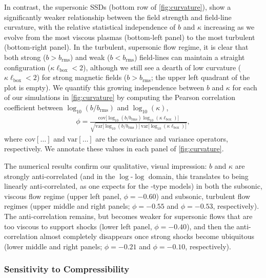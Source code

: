 In contrast, the supersonic SSDs (bottom row of \autoref{fig:curvature}), show a significantly weaker relationship between the field strength and field-line curvature, with the relative statistical independence of $b$ and $\kappa$ increasing as we evolve from the most viscous plasmas (bottom-left panel) to the most turbulent (bottom-right panel). In the turbulent, supersonic flow regime, it is clear that both strong ($b > b_\mathrm{rms}$) and weak ($b < b_\mathrm{rms}$) field-lines can maintain a straight configuration ($\kappa \ell_\mathrm{box} < 2$), although we still see a dearth of low curvature ($\kappa \ell_\mathrm{box} < 2$) for strong magnetic fields ($b > b_\mathrm{rms}$; \ie the upper left quadrant of the plot is empty). We quantify this growing independence between $b$ and $\kappa$ for each of our simulations in \autoref{fig:curvature} by computing the Pearson correlation coefficient between $\log_{10}(b/b_{\mathrm{rms}})$ and $\log_{10}(\kappa)$,
\begin{align}\label{eq:pearson_correlation}
    \phi = \frac{
            \mathrm{cov}\big[ \log_{10}(b/b_{\mathrm{rms}}) \log_{10}(\kappa\ell_{\mathrm{box}}) \big]
        }{
            \sqrt{
                \mathrm{var}\big[ \log_{10}(b/b_{\mathrm{rms}}) \big]
                \, \mathrm{var}\big[ \log_{10}(\kappa\ell_{\mathrm{box}}) \big]
            }
        }
        ,
\end{align}
where $\mathrm{cov}[\hdots]$ and $\mathrm{var}[\hdots]$ are the covariance and variance operators, respectively. We annotate these values in each panel of \autoref{fig:curvature}.

The numerical results confirm our qualitative, visual impression: $b$ and $\kappa$ are strongly anti-correlated (and in the $\log$-$\log$ domain, this translates to being linearly anti-correlated, as one expects for the \citealt{schekochihin2004simulations}-type models) in both the subsonic, viscous flow regime (upper left panel, $\phi = -0.60$) and subsonic, turbulent flow regimes (upper middle and right panels; $\phi = -0.55$ and $\phi = -0.53$, respectively). The anti-correlation remains, but becomes weaker for supersonic flows that are too viscous to support shocks (lower left panel, $\phi = -0.40$), and then the anti-correlation almost completely disappears once strong shocks become ubiquitous (lower middle and right panels; $\phi = -0.21$ and $\phi = -0.10$, respectively).

\subsubsection{Sensitivity to Compressibility}

